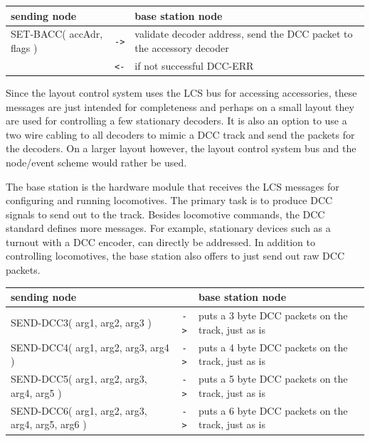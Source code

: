\begin{table}[ht!]
    \begin{center}
        \begin{tabular}{|p{}| c |p{}|}
            \toprule
            \textbf{sending node} & & \textbf{ base station node} \\
            \midrule
            SET-BACC( accAdr, flags ) & \texttt{->} & validate decoder address, send the DCC packet to the accessory decoder \\
            & \texttt{<-} & if not successful DCC-ERR \\
            \bottomrule
        \end{tabular}
    \end{center}
\end{table}

Since the layout control system uses the LCS bus for accessing accessories, these messages are just intended for completeness and perhaps on a small layout they are used for controlling a few stationary decoders. It is also an option to use a two wire cabling to all decoders to mimic a DCC track and send the packets for the decoders. On a larger layout however, the layout control system bus and the node/event scheme would rather be used.


The base station is the hardware module that receives the LCS messages for configuring and running locomotives. The primary task is to produce DCC signals to send out to the track. Besides locomotive commands, the DCC standard defines more messages. For example, stationary devices such as a turnout with a DCC encoder, can directly be addressed. In addition to controlling locomotives, the base station also offers to just send out raw DCC packets.

\begin{table}[ht!]
    \begin{center}
        \begin{tabular}{|p{}| c |p{}|}
            \toprule
            \textbf{sending node} & & \textbf{ base station node} \\
            \midrule
            SEND-DCC3( arg1, arg2, arg3 ) & \texttt{->} & puts a 3 byte DCC packets on the track, just as is \\
            SEND-DCC4( arg1, arg2, arg3, arg4 ) & \texttt{->} & puts a 4 byte DCC packets on the track, just as is \\
            SEND-DCC5( arg1, arg2, arg3, arg4, arg5 ) & \texttt{->} & puts a 5 byte DCC packets on the track, just as is \\
            SEND-DCC6( arg1, arg2, arg3, arg4, arg5, arg6 ) & \texttt{->} & puts a 6 byte DCC packets on the track, just as is \\
            \bottomrule
        \end{tabular}
    \end{center}
\end{table}

